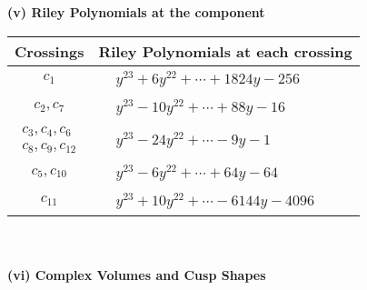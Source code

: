 \documentclass[1p]{elsarticle_modified}
\theoremstyle{definition}
\begin{document}
\newpage\renewcommand{\arraystretch}{1}
\flushleft \textbf{(v) Riley Polynomials at the component}\newline \\
\begin{tabular}{m{50pt}|m{274pt}}
Crossings & \hspace{64pt}Riley Polynomials at each crossing \\
\hline $$\begin{aligned}c_{1}\end{aligned}$$&$\begin{aligned}
&y^{23}+6 y^{22}+\cdots+1824 y-256
\end{aligned}$\\
\hline $$\begin{aligned}c_{2},c_{7}\end{aligned}$$&$\begin{aligned}
&y^{23}-10 y^{22}+\cdots+88 y-16
\end{aligned}$\\
\hline $$\begin{aligned}c_{3},c_{4},c_{6}\\c_{8},c_{9},c_{12}\end{aligned}$$&$\begin{aligned}
&y^{23}-24 y^{22}+\cdots-9 y-1
\end{aligned}$\\
\hline $$\begin{aligned}c_{5},c_{10}\end{aligned}$$&$\begin{aligned}
&y^{23}-6 y^{22}+\cdots+64 y-64
\end{aligned}$\\
\hline $$\begin{aligned}c_{11}\end{aligned}$$&$\begin{aligned}
&y^{23}+10 y^{22}+\cdots-6144 y-4096
\end{aligned}$\\
\hline
\end{tabular}\\~\\
\newpage\flushleft \textbf{(vi) Complex Volumes and Cusp Shapes}
\end{document}
